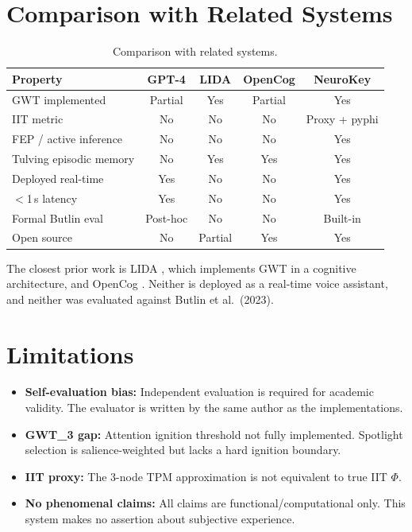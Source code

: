 \documentclass[11pt,a4paper]{article}
\begin{document}
\section{Comparison with Related Systems}

\begin{table}[h]
\centering
\small
\begin{tabular}{lcccc}
\toprule
\textbf{Property} & \textbf{GPT-4} & \textbf{LIDA} & \textbf{OpenCog} & \textbf{NeuroKey} \\
\midrule
GWT implemented        & Partial & Yes & Partial & Yes \\
IIT metric             & No      & No  & No      & Proxy + pyphi \\
FEP / active inference & No      & No  & No      & Yes \\
Tulving episodic memory & No     & Yes & Yes     & Yes \\
Deployed real-time     & Yes     & No  & No      & Yes \\
$<$1\,s latency        & Yes     & No  & No      & Yes \\
Formal Butlin eval     & Post-hoc & No & No     & Built-in \\
Open source            & No      & Partial & Yes & Yes \\
\bottomrule
\end{tabular}
\caption{Comparison with related systems.}
\end{table}

The closest prior work is LIDA \cite{franklin2007}, which implements GWT
in a cognitive architecture, and OpenCog \cite{goertzel2014}.
Neither is deployed as a real-time voice assistant,
and neither was evaluated against Butlin et al.\ (2023).

\section{Limitations}

\begin{itemize}
  \item \textbf{Self-evaluation bias:} Independent evaluation is required for academic validity.
        The evaluator is written by the same author as the implementations.
  \item \textbf{GWT\_3 gap:} Attention ignition threshold not fully implemented.
        Spotlight selection is salience-weighted but lacks a hard ignition boundary.
  \item \textbf{IIT proxy:} The 3-node TPM approximation is not equivalent to true IIT $\Phi$.
  \item \textbf{No phenomenal claims:} All claims are functional/computational only.
        This system makes no assertion about subjective experience.
\end{itemize}
\end{document}
